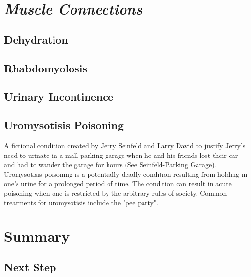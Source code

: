\section{\textit{Muscle Connections}}

\subsection{Dehydration}

\subsection{Rhabdomyolosis}

\subsection{Urinary Incontinence}

\subsection{Uromysotisis Poisoning}

A fictional condition created by Jerry Seinfeld and Larry David to justify Jerry's need to urinate in a mall parking garage when he and his friends lost their car and had to wander the garage for hours (See \href{https://www.youtube.com/watch?v=OG6b7KJ1Ah0}{Seinfeld-Parking Garage}). Uromysotisis poisoning is a potentially deadly condition resulting from holding in one's urine for a prolonged period of time. The condition can result in acute poisoning when one is restricted by the arbitrary rules of society. Common treatments for uromysotisis include the "pee party".

\section{Summary}

\subsection{Next Step}

\printbibliography[heading=subbibintoc]